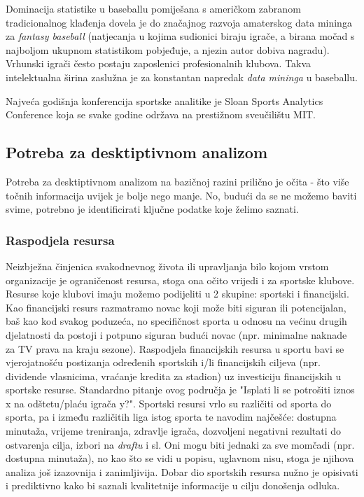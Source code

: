 \documentclass{ferseminar}
\begin{document}
Dominacija statistike u baseballu pomiješana s američkom zabranom tradicionalnog klađenja dovela je do značajnog razvoja amaterskog data mininga za \textit{fantasy baseball} (natjecanja u kojima sudionici biraju igrače, a birana močad s najboljom ukupnom statistikom pobjeđuje, a njezin autor dobiva nagradu). Vrhunski igrači često postaju zaposlenici profesionalnih klubova. Takva intelektualna širina zaslužna je za konstantan napredak \textit{data mininga} u baseballu.

Najveća godišnja konferencija sportske analitike je Sloan Sports Analytics Conference koja se svake godine održava na prestižnom sveučilištu MIT. \cite{Sloan}

\subsection{Potreba za desktiptivnom analizom}

Potreba za desktiptivnom analizom na bazičnoj razini prilično je očita - što više točnih informacija uvijek je bolje nego manje. No, budući da se ne možemo baviti svime, potrebno je identificirati ključne podatke koje želimo saznati.

\subsubsection{Raspodjela resursa}
Neizbježna činjenica svakodnevnog života ili upravljanja bilo kojom vrstom organizacije je ograničenost resursa, stoga ona očito vrijedi i za sportske klubove. Resurse koje klubovi imaju možemo podijeliti u 2 skupine: sportski i financijski. 
\newline
Kao financijski resurs razmatramo novac koji može biti siguran ili potencijalan, baš kao kod svakog poduzeća, no specifičnost sporta u odnosu na većinu drugih djelatnosti da postoji i potpuno siguran budući novac (npr. minimalne naknade za TV prava na kraju sezone). Raspodjela financijskih resursa u sportu bavi se vjerojatnošću postizanja određenih sportskih i/li financijskih ciljeva (npr. dividende vlasnicima, vraćanje kredita za stadion) uz investiciju financijskih u sportske resurse. Standardno pitanje ovog područja je "Isplati li se potrošiti 
iznos x na odštetu/plaću igrača y?".\cite{deloitte}
\newline
Sportski resursi vrlo su različiti od sporta do sporta, pa i između različitih liga istog sporta te navodim najčešće: dostupna minutaža, vrijeme treniranja, zdravlje igrača, dozvoljeni negativni rezultati do ostvarenja cilja, izbori na \textit{draftu} i sl. Oni mogu biti jednaki za sve momčadi (npr. dostupna minutaža), no kao što se vidi u popisu, uglavnom nisu, stoga je njihova analiza još izazovnija i zanimljivija. Dobar dio sportskih resursa nužno je opisivati i prediktivno kako bi saznali kvalitetnije informacije u cilju donošenja odluka.
\end{document}

